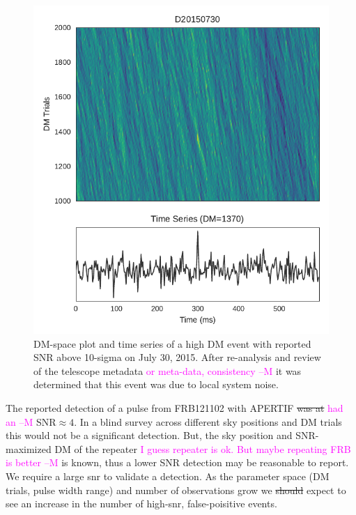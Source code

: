 \documentclass[a4paper,fleqn,usenatbib]{mnras}
\newcommand{\cM}[1]{\textcolor{magenta}{ #1 --M}}
\begin{document}
\begin{figure}
    \includegraphics[width=1.0\linewidth]{figures/D20150730_buf23_Beam6_dmtrial.pdf}
    \caption{DM-space plot and time series of a high DM event with reported SNR
    above 10-sigma on July 30, 2015. After re-analysis and review of the
    telescope metadata \cM{or meta-data, consistency} it was determined that this event was due to local system
    noise.
    }
    \label{fig:D20150730}
\end{figure}

The reported detection of a pulse from FRB121102 with APERTIF \citep{atel10693}
\sout{was at} \cM{had an} SNR$\approx 4$. In a blind survey across different sky positions and DM
trials this would not be a significant detection. But, the sky position and
SNR-maximized DM of the repeater \cM{I guess repeater is ok. But maybe repeating FRB is better} is known, thus a lower SNR detection may be
reasonable to report.  We require a large \gls{snr} to validate a detection.  As
the parameter space (DM trials, pulse width range) and number of observations
grow we \sout{should} expect to see an increase in the number of high-\gls{snr},
false-poisitive events.
\end{document}
